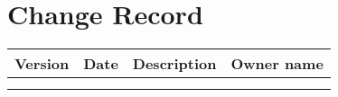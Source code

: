 \newpage
\section*{Change Record}

\begin{table}[!thp]%
\begin{center}

\renewcommand{\arraystretch}{1.2}
\begin{tabular}{|p{1.5cm}|p{2cm}|p{}|p{5cm}|}
\hline
{\bf Version}  &{\bf Date}  &{\bf Description}  & {\bf Owner name}
\\ \hline
  \href{}{}
  &
  &
  &
\\ \hline
  \href{}{}
  &
  &
  &
\\ \hline
\end{tabular}
\renewcommand{\arraystretch}{1.0}
\end{center}
\end{table}
